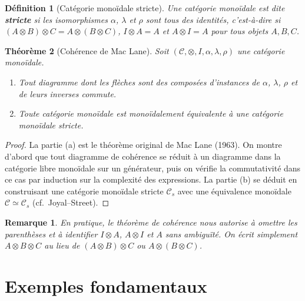 \documentclass[a4paper,12pt]{book}
\newtheorem{theoreme}{Théorème}[chapter]
\newtheorem{definition}[theoreme]{Définition}
\newtheorem*{remarque}{Remarque}
\begin{document}
\begin{definition}[Catégorie monoïdale stricte]\label{def:monoidale-stricte}
Une catégorie monoïdale est dite \textbf{stricte} si les isomorphismes
$\alpha$, $\lambda$ et $\rho$ sont tous des identités, c'est-à-dire
si $(A \otimes B) \otimes C = A \otimes (B \otimes C)$,
$I \otimes A = A$ et $A \otimes I = A$ pour tous objets $A, B, C$.
\end{definition}

\begin{theoreme}[Cohérence de Mac Lane]\label{thm:coherence-maclane}
Soit $(\mathcal{C}, \otimes, I, \alpha, \lambda, \rho)$ une catégorie
monoïdale.
\begin{enumerate}[label=(\alph*)]
\item Tout diagramme dont les flèches sont des composées d'instances de
      $\alpha$, $\lambda$, $\rho$ et de leurs inverses commute.
\item Toute catégorie monoïdale est monoïdalement équivalente à une
      catégorie monoïdale stricte.
\end{enumerate}
\end{theoreme}

\begin{proof}
La partie (a) est le théorème original de Mac Lane (1963).
On montre d'abord que tout diagramme de cohérence se réduit à un diagramme
dans la catégorie libre monoïdale sur un générateur, puis on vérifie
la commutativité dans ce cas par induction sur la complexité des
expressions.  La partie (b) se déduit en construisant une catégorie
monoïdale stricte $\mathcal{C}_s$ avec une équivalence monoïdale
$\mathcal{C} \simeq \mathcal{C}_s$ (cf.\ Joyal--Street).
\end{proof}

\begin{remarque}\label{rem:coherence-pratique}
En pratique, le théorème de cohérence nous autorise à omettre les
parenthèses et à identifier $I \otimes A$, $A \otimes I$ et $A$
sans ambiguïté.  On écrit simplement $A \otimes B \otimes C$
au lieu de $(A \otimes B) \otimes C$ ou $A \otimes (B \otimes C)$.
\end{remarque}

\section{Exemples fondamentaux}\label{sec:monoidale-exemples}
\end{document}
